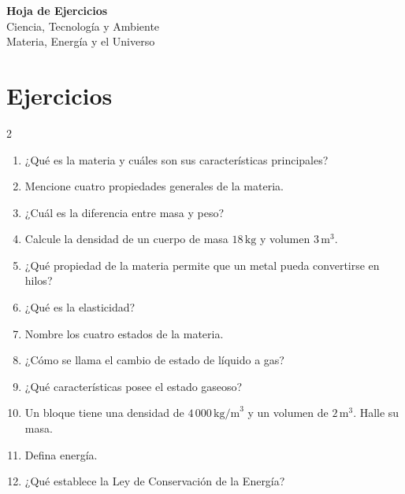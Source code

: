 \documentclass[10pt]{article}
\begin{document}
	
	\begin{center}
		{\Large\bfseries Hoja de Ejercicios}\\[0.2cm]
		{\large Ciencia, Tecnología y Ambiente}\\[0.1cm]
		{\normalsize Materia, Energía y el Universo}
	\end{center}
	
	\section*{Ejercicios}
	
	\begin{multicols}{2}
		
		\begin{enumerate}[label=\textbf{\arabic*.}, itemsep=0.45cm]
			
			\item ¿Qué es la materia y cuáles son sus características principales?
			
			\item Mencione cuatro propiedades generales de la materia.
			
			\item ¿Cuál es la diferencia entre masa y peso?
			
			\item Calcule la densidad de un cuerpo de masa
			$18\,\mathrm{kg}$ y volumen $3\,\mathrm{m}^3$.
			
			\item ¿Qué propiedad de la materia permite que un metal pueda convertirse en hilos?
			
			\item ¿Qué es la elasticidad?
			
			\item Nombre los cuatro estados de la materia.
			
			\item ¿Cómo se llama el cambio de estado de líquido a gas?
			
			\item ¿Qué características posee el estado gaseoso?
			
			\item Un bloque tiene una densidad de
			$4\,000\,\mathrm{kg/m}^3$ y un volumen de
			$2\,\mathrm{m}^3$. Halle su masa.
			
			\item Defina energía.
			
			\item ¿Qué establece la Ley de Conservación de la Energía?
			

\end{enumerate}
\end{multicols}
\end{document}
